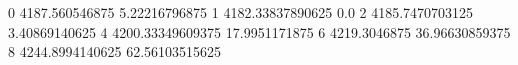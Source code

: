 0 4187.560546875 5.22216796875
1 4182.33837890625 0.0
2 4185.7470703125 3.40869140625
4 4200.33349609375 17.9951171875
6 4219.3046875 36.96630859375
8 4244.8994140625 62.56103515625
